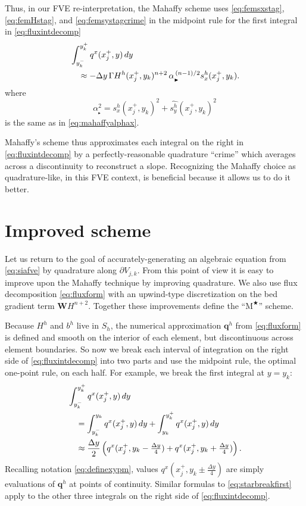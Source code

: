 \documentclass[twocolumn,letterpaper]{igs}
\newcommand\bq{\mathbf{q}}
\newcommand\bW{\mathbf{W}}
\newcommand{\Mstar}{$\text{M}^{\bigstar}$\xspace}
\newcommand\alpharight{\alpha_{{}_{\blacktriangleright}}}
\begin{document}
Thus, in our FVE re-interpretation, the Mahaffy scheme uses \eqref{eq:femsxstag}, \eqref{eq:femHstag}, and \eqref{eq:femsystagcrime} in the midpoint rule for the first integral in \eqref{eq:fluxintdecomp}
\begin{align}
&\int_{y_k^-}^{y_k^+} q^x(x_j^+,y)\,dy  \label{eq:femmahaffyfirstint} \\
  &\quad\approx - \Delta y\, \Gamma H^h(x_j^+,y_k)^{n+2} \,\alpharight^{\,(n-1)/2} s^h_x(x_j^+,y_k). \notag 
\end{align}
where
\begin{equation}
\alpharight^2 = s^h_x(x_j^+,y_k)^2 + \widehat{s^h_y}(x_j^+,y_k)^2
\end{equation}
is the same as in \eqref{eq:mahaffyalphax}.

Mahaffy's scheme thus approximates each integral on the right in \eqref{eq:fluxintdecomp} by a perfectly-reasonable quadrature ``crime'' \citep[compare][]{Strang1972} which averages across a discontinuity to reconstruct a slope.  Recognizing the Mahaffy choice as quadrature-like, in this FVE context, is beneficial because it allows us to do it better.


\section{Improved scheme}  \label{sec:star}

Let us return to the goal of accurately-generating an algebraic equation from \eqref{eq:siafve} by quadrature along $\partial V_{j,k}$.  From this point of view it is easy to improve upon the Mahaffy technique by improving quadrature.  We also use flux decomposition \eqref{eq:fluxform} with an upwind-type discretization on the bed gradient term $\bW H^{n+2}$.  Together these improvements define the ``\Mstar'' scheme.

Because $H^h$ and $b^h$ live in $S_h$, the numerical approximation $\bq^h$ from \eqref{eq:fluxform} is defined and smooth on the interior of each element, but discontinuous across element boundaries.  So now we break each interval of integration on the right side of \eqref{eq:fluxintdecomp} into two parts and use the midpoint rule, the optimal one-point rule, on each half.  For example, we break the first integral at $y=y_k$:
\begin{align}
&\int_{y_k^-}^{y_k^+} q^x(x_j^+,y)\,dy  \label{eq:starbreakfirst} \\
  &\quad= \int_{y_k^-}^{y_k} q^x(x_j^+,y)\,dy + \int_{y_k}^{y_k^+} q^x(x_j^+,y)\,dy \notag \\
  &\quad\approx \frac{\Delta y}{2} \left(q^x(x_j^+,y_k-\tfrac{\Delta y}{4}) + q^x(x_j^+,y_k+\tfrac{\Delta y}{4})\right). \notag
\end{align}
Recalling notation \eqref{eq:definexypm}, values $q^x(x_j^+,y_k\pm\tfrac{\Delta y}{4})$ are simply evaluations of $\bq^h$ at points of continuity.  Similar formulas to \eqref{eq:starbreakfirst} apply to the other three integrals on the right side of \eqref{eq:fluxintdecomp}.
\end{document}
